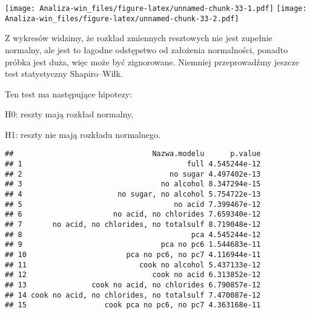 \documentclass[
]{article}
\newenvironment{Shaded}{\begin{snugshade}}{\end{snugshade}}
\newcommand{\ControlFlowTok}[1]{\textcolor[rgb]{0.13,0.29,0.53}{\textbf{#1}}}
\newcommand{\DecValTok}[1]{\textcolor[rgb]{0.00,0.00,0.81}{#1}}
\newcommand{\FunctionTok}[1]{\textcolor[rgb]{0.13,0.29,0.53}{\textbf{#1}}}
\newcommand{\NormalTok}[1]{#1}
\newcommand{\OtherTok}[1]{\textcolor[rgb]{0.56,0.35,0.01}{#1}}
\newcommand{\SpecialCharTok}[1]{\textcolor[rgb]{0.81,0.36,0.00}{\textbf{#1}}}
\newcommand{\StringTok}[1]{\textcolor[rgb]{0.31,0.60,0.02}{#1}}
\begin{document}
\texttt{[image: Analiza-win\_files/figure-latex/unnamed-chunk-33-1.pdf]}
\texttt{[image: Analiza-win\_files/figure-latex/unnamed-chunk-33-2.pdf]}

Z wykresów widzimy, że rozkład zmiennych resztowych nie jest zupełnie
normalny, ale jest to łagodne odstępstwo od założenia normalności,
ponadto próbka jest duża, więc może być zignorowane. Niemniej
przeprowadźmy jeszcze test statystyczny Shapiro--Wilk.

Ten test ma następujące hipotezy:

H0: reszty mają rozkład normalny,

H1: reszty nie mają rozkładu normalnego.

\begin{Shaded}
\end{Shaded}

\begin{verbatim}
##                                Nazwa.modelu      p.value
## 1                                      full 4.545244e-12
## 2                                  no sugar 4.497402e-13
## 3                                no alcohol 8.347294e-15
## 4                      no sugar, no alcohol 5.754722e-13
## 5                                   no acid 7.399467e-12
## 6                     no acid, no chlorides 7.659340e-12
## 7       no acid, no chlorides, no totalsulf 8.719048e-12
## 8                                       pca 4.545244e-12
## 9                                pca no pc6 1.544683e-11
## 10                       pca no pc6, no pc7 4.116944e-11
## 11                          cook no alcohol 5.437133e-12
## 12                             cook no acid 6.313852e-12
## 13               cook no acid, no chlorides 6.790857e-12
## 14 cook no acid, no chlorides, no totalsulf 7.470087e-12
## 15                  cook pca no pc6, no pc7 4.363168e-11
\end{verbatim}
\end{document}
